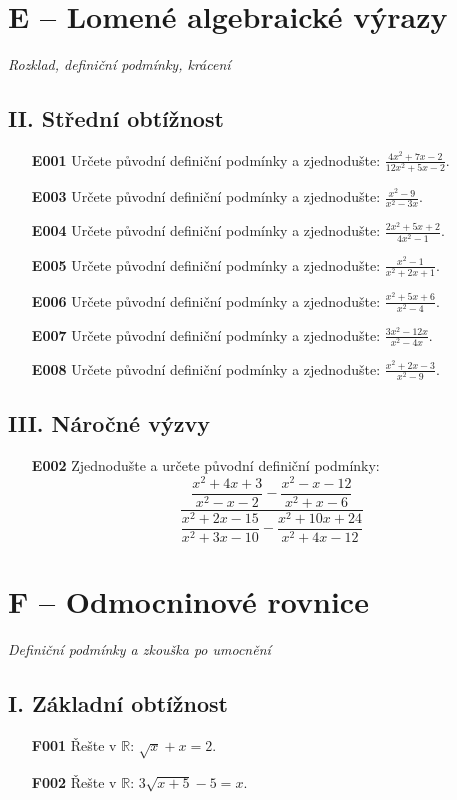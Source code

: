\documentclass[11pt,a4paper]{article}
\begin{document}
\section*{E -- Lomené algebraické výrazy}
\textit{Rozklad, definiční podmínky, krácení}
\subsection*{II. Střední obtížnost}
\begin{enumerate}[label={},itemsep=5pt]
\item[\textbf{E001}] Určete původní definiční podmínky a zjednodušte: $\displaystyle \frac{4x^{2} + 7x - 2}{12x^{2} + 5x - 2}$. 
\item[\textbf{E003}] Určete původní definiční podmínky a zjednodušte: $\displaystyle \frac{x^{2} - 9}{x^{2} - 3x}$.
\item[\textbf{E004}] Určete původní definiční podmínky a zjednodušte: $\displaystyle \frac{2x^{2} + 5x + 2}{4x^{2} - 1}$.
\item[\textbf{E005}] Určete původní definiční podmínky a zjednodušte: $\displaystyle \frac{x^{2} - 1}{x^{2} + 2x + 1}$.
\item[\textbf{E006}] Určete původní definiční podmínky a zjednodušte: $\displaystyle \frac{x^{2} + 5x + 6}{x^{2} - 4}$.
\item[\textbf{E007}] Určete původní definiční podmínky a zjednodušte: $\displaystyle \frac{3x^{2} - 12x}{x^{2} - 4x}$.
\item[\textbf{E008}] Určete původní definiční podmínky a zjednodušte: $\displaystyle \frac{x^{2} + 2x - 3}{x^{2} - 9}$.
\end{enumerate}
\subsection*{III. Náročné výzvy}
\begin{enumerate}[label={},itemsep=5pt]
\item[\textbf{E002}] Zjednodušte a určete původní definiční podmínky: \[\displaystyle \frac{\dfrac{x^2+4x+3}{x^2-x-2}-\dfrac{x^2-x-12}{x^2+x-6}}{\dfrac{x^2+2x-15}{x^2+3x-10}-\dfrac{x^2+10x+24}{x^2+4x-12}}\] 
\end{enumerate}
\section*{F -- Odmocninové rovnice}
\textit{Definiční podmínky a zkouška po umocnění}
\subsection*{I. Základní obtížnost}
\begin{enumerate}[label={},itemsep=5pt]
\item[\textbf{F001}] Řešte v $\mathbb R$: $\sqrt{x}+x=2$. 
\item[\textbf{F002}] Řešte v $\mathbb R$: $3\sqrt{x+5}-5=x$. 
\end{enumerate}
\end{document}
